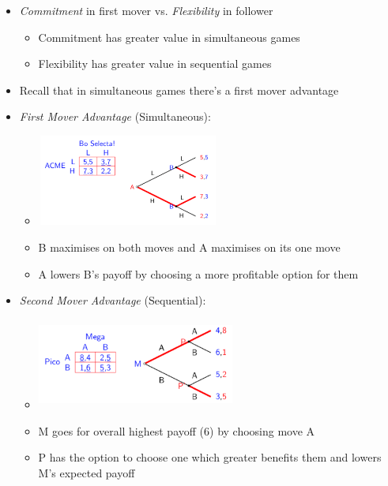 \documentclass[11pt, english]{article}
\begin{document}
	\begin{itemize}
	\setlength\itemsep{0cm}
		\item \textit{Commitment} in first mover vs. \textit{Flexibility} in follower
		\begin{itemize}
			\item Commitment has greater value in simultaneous games 
			\item Flexibility has greater value in sequential games
		\end{itemize}
		\item Recall that in simultaneous games there’s a first mover advantage
		\item \textit{First Mover Advantage} (Simultaneous):
		\begin{itemize}
			\item \begin{center}\includegraphics[width=6cm,height=3cm]{EC315-IMG/2.png}\end{center}
			\item B maximises on both moves and A maximises on its one move
			\item A lowers B’s payoff by choosing a more profitable option for them
		\end{itemize}
		\item \textit{Second Mover Advantage} (Sequential):
			\begin{itemize}                      
                        \item \begin{center}\includegraphics[width=6.5cm,height=3cm]{EC315-IMG/3.png}\end{center}
                        \item M goes for overall highest payoff (6) by choosing move A
                        \item P has the option to choose one which greater benefits them and lowers M’s expected payoff
                \end{itemize}
	\end{itemize}
\end{document}
